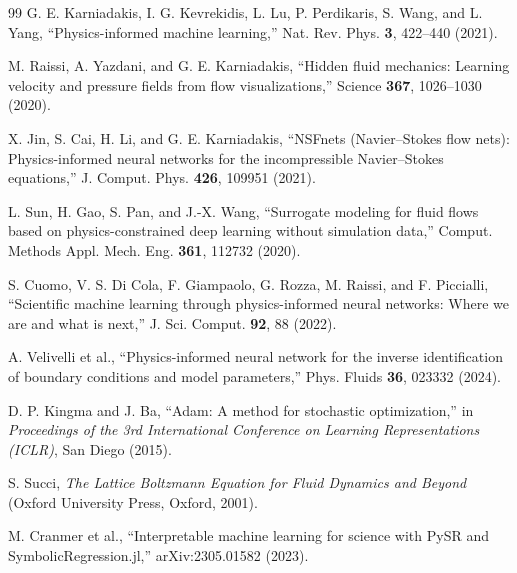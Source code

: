 \documentclass[aip,pof,reprint,superscriptaddress]{revtex4-2}
\begin{document}
\begin{thebibliography}{99}
 G. E. Karniadakis, I. G. Kevrekidis, L. Lu, P. Perdikaris, S. Wang, and L. Yang, ``Physics-informed machine learning,'' Nat. Rev. Phys. \textbf{3}, 422--440 (2021).

 M. Raissi, A. Yazdani, and G. E. Karniadakis, ``Hidden fluid mechanics: Learning velocity and pressure fields from flow visualizations,'' Science \textbf{367}, 1026--1030 (2020).

 X. Jin, S. Cai, H. Li, and G. E. Karniadakis, ``NSFnets (Navier--Stokes flow nets): Physics-informed neural networks for the incompressible Navier--Stokes equations,'' J. Comput. Phys. \textbf{426}, 109951 (2021).

 L. Sun, H. Gao, S. Pan, and J.-X. Wang, ``Surrogate modeling for fluid flows based on physics-constrained deep learning without simulation data,'' Comput. Methods Appl. Mech. Eng. \textbf{361}, 112732 (2020).

 S. Cuomo, V. S. Di Cola, F. Giampaolo, G. Rozza, M. Raissi, and F. Piccialli, ``Scientific machine learning through physics-informed neural networks: Where we are and what is next,'' J. Sci. Comput. \textbf{92}, 88 (2022).

 A. Velivelli et al., ``Physics-informed neural network for the inverse identification of boundary conditions and model parameters,'' Phys. Fluids \textbf{36}, 023332 (2024).

 D. P. Kingma and J. Ba, ``Adam: A method for stochastic optimization,'' in \emph{Proceedings of the 3rd International Conference on Learning Representations (ICLR)}, San Diego (2015).

 S. Succi, \emph{The Lattice Boltzmann Equation for Fluid Dynamics and Beyond} (Oxford University Press, Oxford, 2001).

 M. Cranmer et al., ``Interpretable machine learning for science with PySR and SymbolicRegression.jl,'' arXiv:2305.01582 (2023).

\end{thebibliography}
\end{document}
